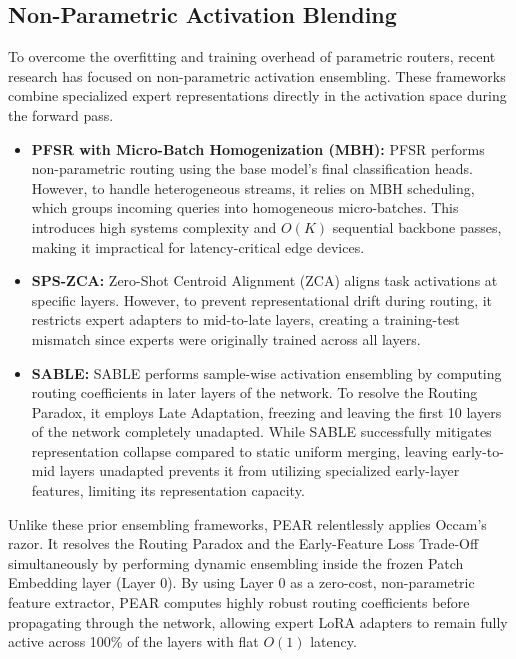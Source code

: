 \subsection{Non-Parametric Activation Blending}
To overcome the overfitting and training overhead of parametric routers, recent research has focused on non-parametric activation ensembling. These frameworks combine specialized expert representations directly in the activation space during the forward pass.
\begin{itemize}
    \item \textbf{PFSR with Micro-Batch Homogenization (MBH):} PFSR \cite{pfsr2024} performs non-parametric routing using the base model's final classification heads. However, to handle heterogeneous streams, it relies on MBH scheduling, which groups incoming queries into homogeneous micro-batches. This introduces high systems complexity and $O(K)$ sequential backbone passes, making it impractical for latency-critical edge devices.
    \item \textbf{SPS-ZCA:} Zero-Shot Centroid Alignment (ZCA) \cite{spszca2025} aligns task activations at specific layers. However, to prevent representational drift during routing, it restricts expert adapters to mid-to-late layers, creating a training-test mismatch since experts were originally trained across all layers.
    \item \textbf{SABLE:} SABLE \cite{sable2025} performs sample-wise activation ensembling by computing routing coefficients in later layers of the network. To resolve the Routing Paradox, it employs Late Adaptation, freezing and leaving the first 10 layers of the network completely unadapted. While SABLE successfully mitigates representation collapse compared to static uniform merging, leaving early-to-mid layers unadapted prevents it from utilizing specialized early-layer features, limiting its representation capacity.
\end{itemize}

Unlike these prior ensembling frameworks, PEAR relentlessly applies Occam's razor. It resolves the Routing Paradox and the Early-Feature Loss Trade-Off simultaneously by performing dynamic ensembling inside the frozen Patch Embedding layer (Layer 0). By using Layer 0 as a zero-cost, non-parametric feature extractor, PEAR computes highly robust routing coefficients before propagating through the network, allowing expert LoRA adapters to remain fully active across 100\% of the layers with flat $O(1)$ latency.
